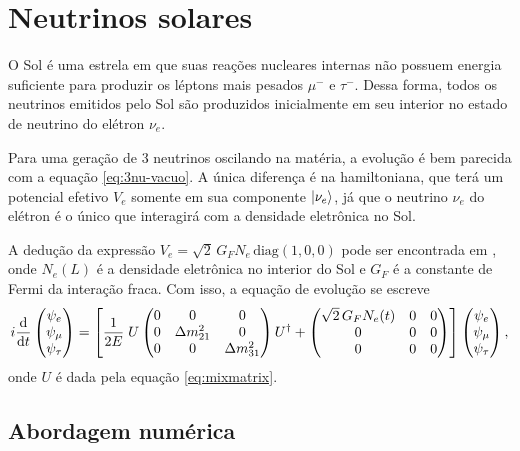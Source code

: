 \documentclass[12pt]{report}
\begin{document}
\section{Neutrinos solares} \label{sec:solar-nu}

O Sol é uma estrela em que suas reações nucleares internas não possuem energia suficiente para produzir os léptons mais pesados $\mu^-$ e $\tau^-$. Dessa forma, todos os neutrinos emitidos pelo Sol são produzidos inicialmente em seu interior no estado de neutrino do elétron $\nu_e$.

Para uma geração de 3 neutrinos oscilando na matéria, a evolução é bem parecida com a equação \ref{eq:3nu-vacuo}. A única diferença é na hamiltoniana, que terá um potencial efetivo $V_e$ somente em sua componente $\ket{\nu_e}$, já que o neutrino $\nu_e$ do elétron é o único que interagirá com a densidade eletrônica no Sol.

A dedução da expressão $V_e = \sqrt{2} \, G_F N_e \, \text{diag}(1,0,0)$ pode ser encontrada em \cite{gonzalez}, onde $N_e(L)$ é a densidade eletrônica no interior do Sol e $G_F$ é a constante de Fermi da interação fraca. Com isso, a equação de evolução se escreve
\begin{equation} \label{eq:evol}
i \dv{t}
\begin{pmatrix}
\psi_e \\ \psi_\mu \\ \psi_\tau
\end{pmatrix}
= \qty[ \frac{1}{2E} \; U
\begin{pmatrix}
0 & 0 & 0 \\
0 & \Delta m_{21}^2 & 0 \\
0 & 0 & \Delta m_{31}^2 \\
\end{pmatrix}
U^\dagger +
\begin{pmatrix}
\sqrt{2} \, G_F N_e(t) & 0 & 0 \\
0 & 0 & 0 \\
0 & 0 & 0 \\
\end{pmatrix}
]
\begin{pmatrix}
\psi_e \\ \psi_\mu \\ \psi_\tau
\end{pmatrix},
\end{equation}
onde $U$ é dada pela equação \ref{eq:mixmatrix}.


\subsection{Abordagem numérica} \label{sec:magnus}
\end{document}

